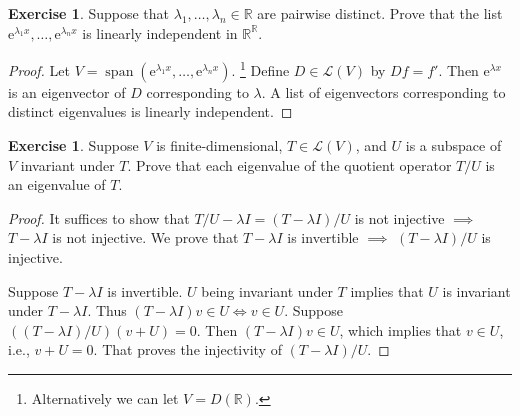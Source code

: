 \documentclass[colorlinks]{tufte-handout}
\theoremstyle{plain} %
\theoremstyle{definition}
\newtheorem{defn}[thm]{Definition}
\newtheorem{exer}[thm]{Exercise}
\theoremstyle{remark}
\newcommand{\R}{\mathbb{R}}
\renewcommand{\L}{\mathcal{L}}
\newcommand{\e}{\mathrm{e}}
\DeclareMathOperator{\spn}{span}
\begin{document}

\begin{exer}
	Suppose that $\lambda_1,\dots,\lambda_n\in\R$ are pairwise distinct. Prove that the list $\e^{\lambda_1x},\dots,\e^{\lambda_nx}$ is linearly independent in $\R^\R$.
\end{exer}
\begin{proof}
	Let $V=\spn(\e^{\lambda_1x},\dots,\e^{\lambda_nx})$.%
	\footnote{Alternatively we can let $V=D(\R)$.}
	Define $D\in\L(V)$ by $Df=f'$. Then $\e^{\lambda x}$ is an eigenvector of $D$ corresponding to $\lambda$. A list of eigenvectors corresponding to distinct eigenvalues is linearly independent.
\end{proof}


\begin{exer}
	Suppose $V$ is finite-dimensional, $T\in\L(V)$, and $U$ is a subspace of $V$ invariant under $T$. Prove that each eigenvalue of the quotient operator $T/U$ is an eigenvalue of $T$.
\end{exer}
\begin{proof}
	It suffices to show that $T/U-\lambda I=(T-\lambda I)/U$ is not injective $\implies$ $T-\lambda I$ is not injective. We prove that $T-\lambda I$ is invertible $\implies$ $(T-\lambda I)/U$ is injective.

	Suppose $T-\lambda I$ is invertible. $U$ being invariant under $T$ implies that $U$ is invariant under $T-\lambda I$. Thus $(T-\lambda I)v\in U\iff v\in U$. Suppose $((T-\lambda I)/U)(v+U)=0$. Then $(T-\lambda I)v\in U$, which implies that $v\in U$, i.e., $v+U=0$. That proves the injectivity of $(T-\lambda I)/U$.
\end{proof}
\end{document}
